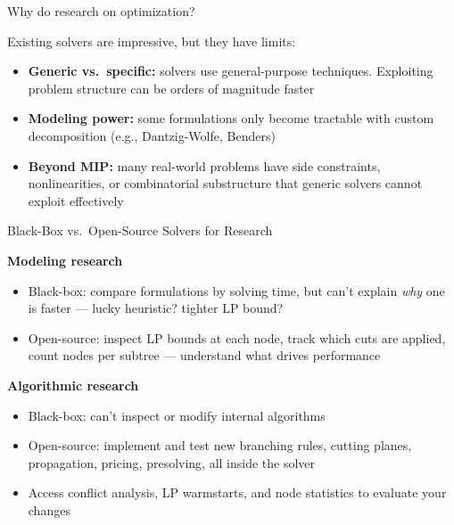 \documentclass{beamer}
\begin{document}
\begin{frame}{Why do research on optimization?}

Existing solvers are impressive, but they have limits:

\medskip
\begin{itemize}
  \item \textbf{Generic vs.\ specific:} solvers use general-purpose techniques.
  Exploiting problem structure can be orders of magnitude faster
  \item \textbf{Modeling power:} some formulations only become tractable with custom decomposition (e.g., Dantzig-Wolfe, Benders)
  \item \textbf{Beyond MIP:} many real-world problems have side constraints, nonlinearities, or combinatorial substructure that generic solvers cannot exploit effectively
\end{itemize}

\end{frame}

\begin{frame}{Black-Box vs.\ Open-Source Solvers for Research}

\textbf{Modeling research}
\begin{itemize}
  \item Black-box: compare formulations by solving time, but can't explain \emph{why} one is faster --- lucky heuristic? tighter LP bound?
  \item Open-source: inspect LP bounds at each node, track which cuts are applied, count nodes per subtree --- understand what drives performance
\end{itemize}

\medskip
\textbf{Algorithmic research}
\begin{itemize}
  \item Black-box: can't inspect or modify internal algorithms
  \item Open-source: implement and test new branching rules, cutting planes, propagation, pricing, presolving, all inside the solver
  \item Access conflict analysis, LP warmstarts, and node statistics to evaluate your changes
\end{itemize}

\end{frame}
\end{document}
